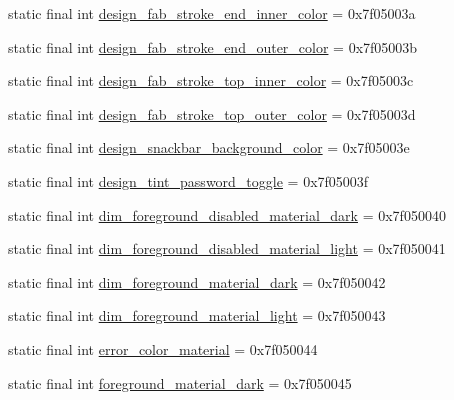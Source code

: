 \begin{DoxyCompactItemize}
\item 
static final int \mbox{\hyperlink{classandroid_1_1support_1_1design_1_1_r_1_1color_ae422c5b9bdcdfd3f3b12af9ea73d7502}{design\+\_\+fab\+\_\+stroke\+\_\+end\+\_\+inner\+\_\+color}} = 0x7f05003a
\item 
static final int \mbox{\hyperlink{classandroid_1_1support_1_1design_1_1_r_1_1color_a90f53392b91368cfa9ccc82ddb2f832d}{design\+\_\+fab\+\_\+stroke\+\_\+end\+\_\+outer\+\_\+color}} = 0x7f05003b
\item 
static final int \mbox{\hyperlink{classandroid_1_1support_1_1design_1_1_r_1_1color_af4c410bd549cf381e12218489c5bd403}{design\+\_\+fab\+\_\+stroke\+\_\+top\+\_\+inner\+\_\+color}} = 0x7f05003c
\item 
static final int \mbox{\hyperlink{classandroid_1_1support_1_1design_1_1_r_1_1color_a06bcbfb568481efb0dad54df0a2ee160}{design\+\_\+fab\+\_\+stroke\+\_\+top\+\_\+outer\+\_\+color}} = 0x7f05003d
\item 
static final int \mbox{\hyperlink{classandroid_1_1support_1_1design_1_1_r_1_1color_a8a804a0e2e3fd52f3c386d672cdffe87}{design\+\_\+snackbar\+\_\+background\+\_\+color}} = 0x7f05003e
\item 
static final int \mbox{\hyperlink{classandroid_1_1support_1_1design_1_1_r_1_1color_aa96fdd961247fabd3460572032cc428c}{design\+\_\+tint\+\_\+password\+\_\+toggle}} = 0x7f05003f
\item 
static final int \mbox{\hyperlink{classandroid_1_1support_1_1design_1_1_r_1_1color_a8365b6d42a0ee37da75c99119f8dd10a}{dim\+\_\+foreground\+\_\+disabled\+\_\+material\+\_\+dark}} = 0x7f050040
\item 
static final int \mbox{\hyperlink{classandroid_1_1support_1_1design_1_1_r_1_1color_aa3a60b269d7e33b90c2dad08aaf68b76}{dim\+\_\+foreground\+\_\+disabled\+\_\+material\+\_\+light}} = 0x7f050041
\item 
static final int \mbox{\hyperlink{classandroid_1_1support_1_1design_1_1_r_1_1color_ab8a94cd46177343a91105b918d61508a}{dim\+\_\+foreground\+\_\+material\+\_\+dark}} = 0x7f050042
\item 
static final int \mbox{\hyperlink{classandroid_1_1support_1_1design_1_1_r_1_1color_abc2b9e0a3a6c52f660f46f0936055388}{dim\+\_\+foreground\+\_\+material\+\_\+light}} = 0x7f050043
\item 
static final int \mbox{\hyperlink{classandroid_1_1support_1_1design_1_1_r_1_1color_a93e9d399a1480c79b4e56a943420f56c}{error\+\_\+color\+\_\+material}} = 0x7f050044
\item 
static final int \mbox{\hyperlink{classandroid_1_1support_1_1design_1_1_r_1_1color_a0d0dfa4680f7f421fba2e31829ad77ed}{foreground\+\_\+material\+\_\+dark}} = 0x7f050045

\end{DoxyCompactItemize}
